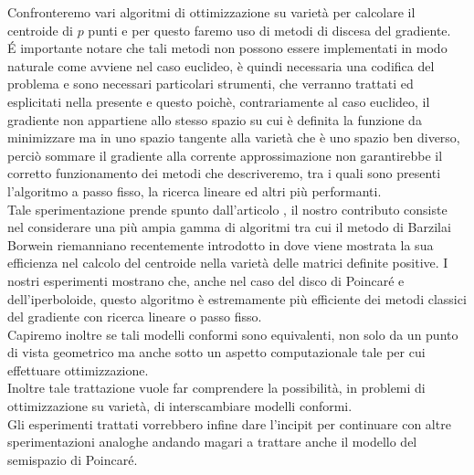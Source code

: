 \documentclass[a4paper, 12pt]{article}
\begin{document}
Confronteremo vari algoritmi di ottimizzazione su varietà per calcolare il centroide di $p$ punti e per questo faremo uso di metodi di discesa del gradiente.\\
\'E importante notare che tali metodi non possono essere implementati in modo naturale come avviene nel caso euclideo, è quindi necessaria una codifica del problema e sono necessari particolari strumenti, che verranno trattati ed esplicitati nella presente e questo poichè, contrariamente al caso euclideo, il gradiente non appartiene allo stesso spazio su cui è definita la funzione da minimizzare ma in uno spazio tangente alla varietà che è uno spazio ben diverso, perciò sommare il gradiente alla corrente approssimazione non garantirebbe il corretto funzionamento dei metodi che descriveremo, tra i quali sono presenti l'algoritmo a passo fisso, la ricerca lineare ed altri più performanti.\\
Tale sperimentazione prende spunto dall'articolo \cite{Wilson}, il nostro contributo consiste nel considerare una più ampia gamma di algoritmi tra cui il metodo di Barzilai Borwein riemanniano recentemente introdotto in \cite{Iannazzo} dove viene mostrata la sua efficienza nel calcolo del centroide nella varietà delle matrici definite positive. I nostri esperimenti mostrano che, anche nel caso del disco di Poincaré e dell'iperboloide, questo algoritmo è estremamente più efficiente dei metodi classici del gradiente con ricerca lineare o passo fisso.\\
Capiremo inoltre se tali modelli conformi sono equivalenti, non solo da un punto di vista geometrico ma anche sotto un aspetto computazionale tale per cui effettuare ottimizzazione.\\
Inoltre tale trattazione vuole far comprendere la possibilità, in problemi di ottimizzazione su varietà, di interscambiare modelli conformi.\\
Gli esperimenti trattati vorrebbero infine dare l'incipit per continuare con altre sperimentazioni analoghe andando magari a trattare anche il modello del semispazio di Poincaré.
\end{document}
